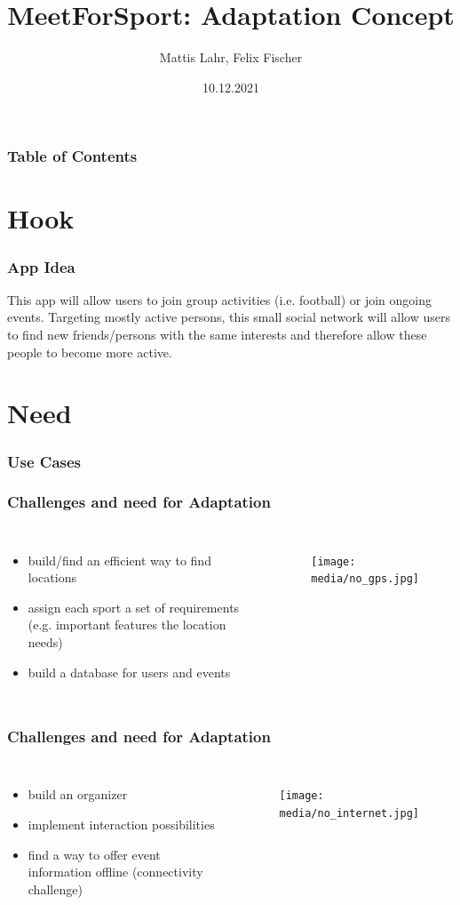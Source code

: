 \documentclass[aspectratio=169]{beamer}
\title{MeetForSport: Adaptation Concept}
\author{Mattis Lahr, Felix Fischer}
\date{10.12.2021}
\begin{document}
\maketitle



\begin{frame}
    \frametitle{Table of Contents}
    \tableofcontents
\end{frame}



\section{Hook}
\begin{frame}
\frametitle{App Idea}
This app will allow users to join group activities (i.e. football) or join ongoing events.
Targeting mostly active persons, this small social network will allow users  to find new friends/persons with the same interests and therefore allow these people to become more active.
\end{frame}

\section{Need}
	\begin{frame}
		\frametitle{Use Cases}
	\end{frame}

	\begin{frame}
		\frametitle{Challenges and need for Adaptation}
		\begin{columns}
			\begin{itemize}
				\item build/find an efficient way to find locations
				\item assign each sport a set of requirements (e.g. important features the location needs)
				\item build a database for users and events
			\end{itemize}
			 \begin{figure}
				 \centering
				\texttt{[image: media/no\_gps.jpg]}
			\end{figure}
		\end{columns}
	\end{frame}
	
	\begin{frame}
		\frametitle{Challenges and need for Adaptation}
		\begin{columns}
		  \column{0.4\linewidth} 
			\begin{itemize}
				\item build an organizer 
				\item implement interaction possibilities
				\item find a way to offer event information offline (connectivity challenge)
			\end{itemize}
		\column{0.6\linewidth}   
			 \begin{figure}
			 \centering
			\texttt{[image: media/no\_internet.jpg]}
		\end{figure}
		\end{columns}
	\end{frame}
\end{document}
